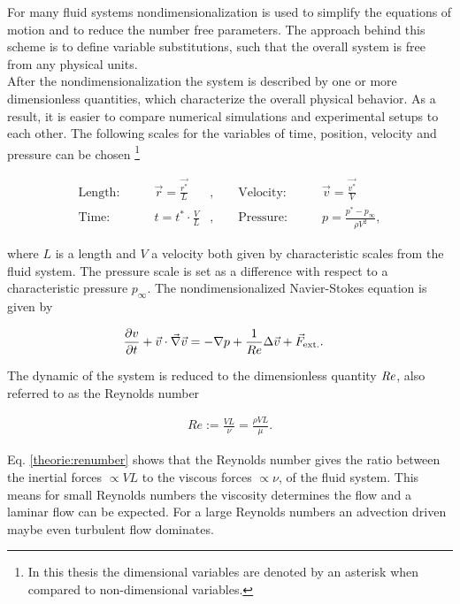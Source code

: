 For many fluid systems nondimensionalization is used to simplify the equations of motion and to reduce the number free parameters.
The approach behind this scheme is to define variable substitutions, such that the overall system is free from any physical units.\\
After the nondimensionalization the system is described by one or more dimensionless quantities, which characterize the overall physical behavior.
As a result, it is easier to compare numerical simulations and experimental setups to each other.
The following scales for the variables of time, position, velocity and pressure can be chosen \cite{Kundu2012}
\footnote{In this thesis the dimensional variables are denoted by an asterisk when compared to non-dimensional variables.}

\begin{align}
    \text{Length:}\qquad &  \vec{r} = \frac{\vec{r^*}}{L}  &, \qquad \text{Velocity:}\qquad& \vec{v} = \frac{\vec{v^*}}{V}\\
    \text{Time:}  \qquad & t = t^* \cdot \frac{V}{L}      &,  \qquad  \text{Pressure:}\qquad & p = \frac{p^* - p_\infty}{\rho V^2},
\end{align}

where  $L$ is a length and $V$  a velocity both given by characteristic scales from the fluid system.
The pressure scale is set as a difference with respect to a characteristic pressure $p_\infty$.
The nondimensionalized Navier-Stokes equation is given by

\begin{align}
    \pdn[v]{t} + \vec{v} \cdot \vec{\nabla} \vec{v} &= -\nabla p + \frac{1}{Re} \Delta \vec{v} + \vec{F}_{\text{ext.}}.
\end{align}

The dynamic of the system is reduced to the dimensionless quantity $\Rey$, also referred to as the Reynolds number \citep{Kundu2012}

\begin{align}
    \label{theorie:renumber}
    Re := \frac{VL}{\nu} = \frac{\rho VL}{\mu}.
\end{align}

Eq. \ref{theorie:renumber} shows that the Reynolds number gives the ratio between the inertial forces $\propto VL$
to the viscous forces $\propto \nu$, of the fluid system.
This means for small Reynolds numbers the viscosity determines the flow and a laminar flow can be expected.
For a large Reynolds numbers an  advection driven maybe even turbulent flow dominates.
\clearpage

